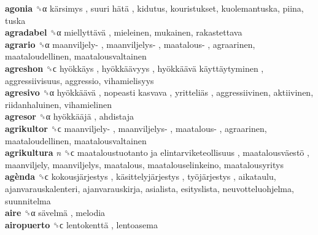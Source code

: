 \textbf{agonia} ␝α   kärsimys ,  suuri hätä , kidutus, kouristukset, kuolemantuska, piina, tuska  \\
\textbf{agradabel} ␝α   miellyttävä , mieleinen, mukainen, rakastettava  \\
\textbf{agrario} ␝α   maanviljely- ,  maanviljelys- ,  maatalous- , agraarinen, maataloudellinen, maatalousvaltainen  \\
\textbf{agreshon} ␝ϲ   hyökkäys ,  hyökkäävyys ,  hyökkäävä käyttäytyminen , aggressiivisuus, aggressio, vihamielisyys  \\
\textbf{agresivo} ␝α   hyökkäävä ,  nopeasti kasvava ,  yritteliäs , aggressiivinen, aktiivinen, riidanhaluinen, vihamielinen  \\
\textbf{agresor} ␝α   hyökkääjä , ahdistaja  \\
\textbf{agrikultor} ␝ϲ   maanviljely- ,  maanviljelys- ,  maatalous- , agraarinen, maataloudellinen, maatalousvaltainen  \\
\textbf{agrikultura} \emph{n}  ␝ϲ   maataloustuotanto ja elintarviketeollisuus ,  maatalousväestö , maanviljely, maanviljelys, maatalous, maatalouselinkeino, maatalousyritys  \\
\textbf{agènda} ␝ϲ   kokousjärjestys ,  käsittelyjärjestys ,  työjärjestys , aikataulu, ajanvarauskalenteri, ajanvarauskirja, asialista, esityslista, neuvotteluohjelma, suunnitelma  \\
\textbf{aire} ␝α   sävelmä , melodia  \\
\textbf{airopuerto} ␝ϲ   lentokenttä , lentoasema  \\
